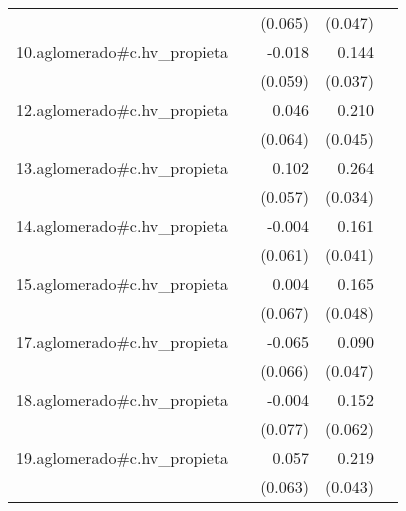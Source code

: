 {\begin{longtable}{l*{4}{D{.}{.}{-1}}}
            &                     &     (0.065)         &     (0.047)         &                     \\
\addlinespace
10.aglomerado#c.hv\_propieta&                     &      -0.018         &       0.144\sym{***}&                     \\
            &                     &     (0.059)         &     (0.037)         &                     \\
\addlinespace
12.aglomerado#c.hv\_propieta&                     &       0.046         &       0.210\sym{***}&                     \\
            &                     &     (0.064)         &     (0.045)         &                     \\
\addlinespace
13.aglomerado#c.hv\_propieta&                     &       0.102         &       0.264\sym{***}&                     \\
            &                     &     (0.057)         &     (0.034)         &                     \\
\addlinespace
14.aglomerado#c.hv\_propieta&                     &      -0.004         &       0.161\sym{***}&                     \\
            &                     &     (0.061)         &     (0.041)         &                     \\
\addlinespace
15.aglomerado#c.hv\_propieta&                     &       0.004         &       0.165\sym{***}&                     \\
            &                     &     (0.067)         &     (0.048)         &                     \\
\addlinespace
17.aglomerado#c.hv\_propieta&                     &      -0.065         &       0.090         &                     \\
            &                     &     (0.066)         &     (0.047)         &                     \\
\addlinespace
18.aglomerado#c.hv\_propieta&                     &      -0.004         &       0.152\sym{*}  &                     \\
            &                     &     (0.077)         &     (0.062)         &                     \\
\addlinespace
19.aglomerado#c.hv\_propieta&                     &       0.057         &       0.219\sym{***}&                     \\
            &                     &     (0.063)         &     (0.043)         &                     \\

\end{longtable}}
